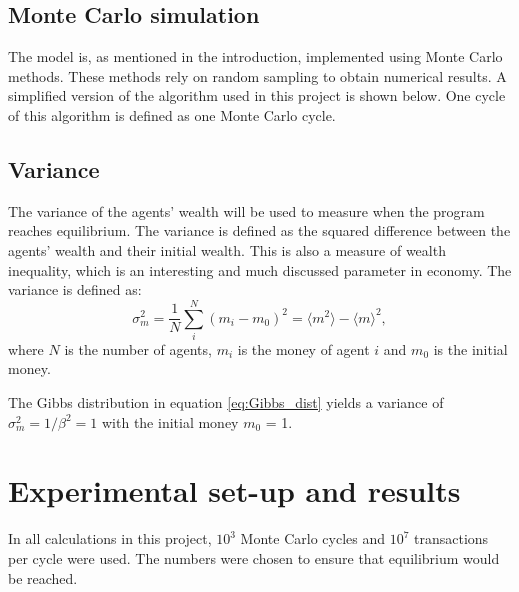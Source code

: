 \documentclass[11pt,a4paper,titlepage]{article}
\begin{document}
\subsection{Monte Carlo simulation}
The model is, as mentioned in the introduction, implemented using Monte Carlo methods. These methods rely on random sampling to obtain numerical results. A simplified version of the algorithm used in this project is shown below. One cycle of this algorithm is defined as one Monte Carlo cycle. 
\bigbreak
{}

\subsection{Variance}
The variance of the agents' wealth will be used to measure when the program reaches equilibrium. The variance is defined as the squared difference between the agents' wealth and their initial wealth. This is also a measure of wealth inequality, which is an interesting and much discussed parameter in economy. The variance is defined as:
\begin{equation}
\label{eq:variance}
\sigma_{m}^{2} = \frac{1}{N}\sum_i^{N}(m_{i}-m_{0})^2 = \langle m^{2} \rangle - \langle m \rangle^{2},
\end{equation}
where $N$ is the number of agents, $m_i$ is the money of agent $i$ and $m_0$ is the initial money. 

The Gibbs distribution in equation \ref{eq:Gibbs_dist} yields a variance of $\sigma^2_m = 1/\beta^2=1$ with the initial money $m_0$ = 1. 
\section{Experimental set-up and results}
In all calculations in this project, $\textrm{$10^3$}$ Monte Carlo cycles and $\textrm{$10^7$}$ transactions per cycle were used. The numbers were chosen to ensure that equilibrium would be reached. 
\end{document}
